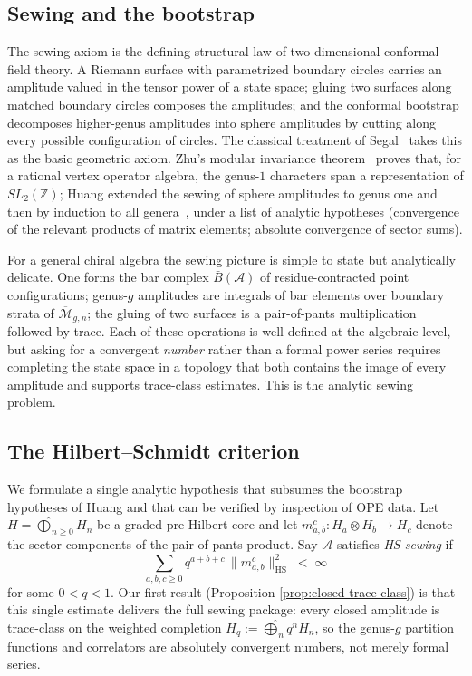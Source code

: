 \documentclass[11pt,reqno]{amsart}
\theoremstyle{definition}
\theoremstyle{remark}
\newcommand{\cA}{\mathcal{A}}
\newcommand{\cM}{\mathcal{M}}
\newcommand{\barB}{\bar{B}}
\newcommand{\HS}{\mathrm{HS}}
\numberwithin{equation}{section}
\begin{document}
\subsection{Sewing and the bootstrap}

The sewing axiom is the defining structural law of
two-dimensional conformal field theory. A Riemann surface with
parametrized boundary circles carries an amplitude valued in the
tensor power of a state space; gluing two surfaces along matched
boundary circles composes the amplitudes; and the conformal
bootstrap decomposes higher-genus amplitudes into sphere
amplitudes by cutting along every possible configuration of
circles. The classical treatment of Segal~\cite{Segal88} takes
this as the basic geometric axiom. Zhu's modular invariance
theorem~\cite{Zhu96} proves that, for a rational vertex operator
algebra, the genus-$1$ characters span a representation of
$SL_2(\mathbb{Z})$; Huang extended the sewing of
sphere amplitudes to genus one and then by induction to all
genera~\cite{Huang05}, under a list of analytic hypotheses
(convergence of the relevant products of matrix elements; absolute
convergence of sector sums).

For a general chiral algebra the sewing picture is simple to
state but analytically delicate. One forms the bar complex
$\barB(\cA)$ of residue-contracted point configurations; genus-$g$
amplitudes are integrals of bar elements over boundary strata of
$\overline{\cM}_{g,n}$; the gluing of two surfaces is a
pair-of-pants multiplication followed by trace. Each of these
operations is well-defined at the algebraic level, but asking
for a convergent \emph{number} rather than a formal power series
requires completing the state space in a topology that both
contains the image of every amplitude and supports trace-class
estimates. This is the analytic sewing problem.

\subsection{The Hilbert--Schmidt criterion}

We formulate a single analytic hypothesis that subsumes the
bootstrap hypotheses of Huang and that can be verified by
inspection of OPE data. Let $H = \widehat{\bigoplus}_{n \geq 0}
H_n$ be a graded pre-Hilbert core and let
$m_{a,b}^c \colon H_a \otimes H_b \to H_c$ denote the sector
components of the pair-of-pants product. Say $\cA$ satisfies
\emph{HS-sewing} if
\begin{equation}\label{eq:hs-intro}
\sum_{a,b,c \geq 0} q^{a+b+c}\, \|m_{a,b}^c\|_{\HS}^2
\;<\; \infty
\end{equation}
for some $0 < q < 1$. Our first result (Proposition
\ref{prop:closed-trace-class}) is that this single estimate
delivers the full sewing package: every closed amplitude is
trace-class on the weighted completion
$H_q := \widehat{\bigoplus}_n q^n H_n$, so the genus-$g$ partition
functions and correlators are absolutely convergent numbers,
not merely formal series.
\end{document}
